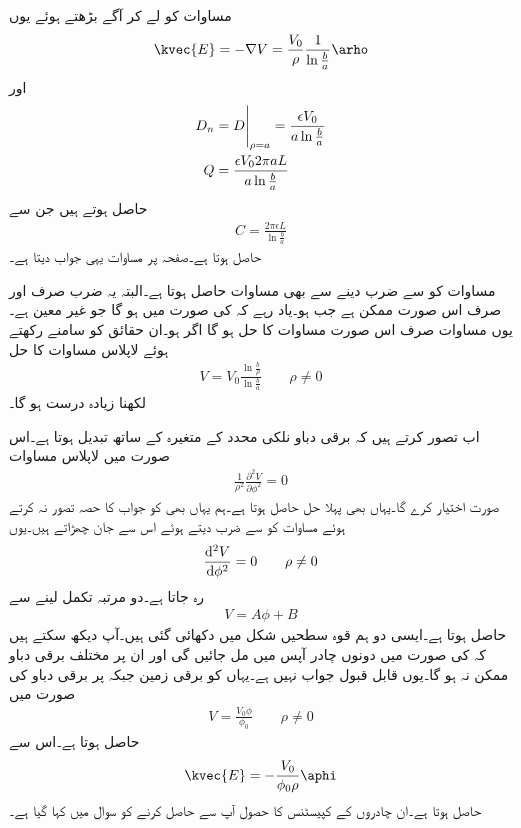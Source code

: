 مساوات  کو لے کر آگے بڑھتے ہوئے یوں
\begin{align*}
\kvec{E}=-\nabla V=\frac{V_0}{\rho} \frac{1}{\ln \frac{b}{a}} \arho
\end{align*}
اور
\begin{align*}
D_n&=\eval{D}_{\rho=a}=\frac{\epsilon V_0}{a\ln \frac{b}{a}}\\
Q&=\frac{\epsilon V_0 2 \pi a L}{a \ln \frac{b}{a}}
\end{align*}
حاصل ہوتے ہیں جن سے
\begin{align}
C=\frac{2\pi \epsilon L}{\ln \frac{b}{a}}
\end{align}
حاصل ہوتا ہے۔صفحہ  پر مساوات  یہی جواب دیتا ہے۔

مساوات  کو  سے ضرب دینے سے بھی مساوات  حاصل ہوتا ہے۔البتہ یہ ضرب صرف اور صرف اس صورت ممکن ہے جب  ہو۔یاد رہے کہ  کی صورت میں  ہو گا جو غیر معین ہے۔یوں  مساوات  صرف اس صورت مساوات  کا حل ہو گا اگر  ہو۔ان حقائق کو سامنے رکھتے ہوئے لاپلاس مساوات کا حل
\begin{align}
V=V_0 \frac{\ln \frac{b}{\rho} }{\ln \frac{b}{a} } \quad \quad \rho \ne 0
\end{align}
لکھنا زیادہ درست ہو گا۔

اب تصور کرتے ہیں کہ برقی دباو نلکی محدد کے متغیرہ  کے ساتھ تبدیل ہوتا ہے۔اس صورت میں لاپلاس مساوات
\begin{align*}
\frac{1}{\rho^2}\frac{\partial^2 V}{\partial \phi^2}=0
\end{align*}
صورت اختیار کرے گا۔یہاں بھی پہلا حل  حاصل ہوتا ہے۔ہم یہاں بھی  کو جواب کا حصہ تصور نہ کرتے ہوئے مساوات کو  سے ضرب دیتے ہوئے اس سے جان چھڑاتے ہیں۔یوں
\begin{align*}
\frac{\dif{^2} V}{\dif \phi^2}=0   \quad \quad \rho \ne 0
\end{align*}
رہ جاتا ہے۔دو مرتبہ تکمل لینے سے
\begin{align*}
V=A \phi+B
\end{align*}
حاصل ہوتا ہے۔ایسی دو ہم قوہ سطحیں شکل میں دکھائی گئی ہیں۔آپ دیکھ سکتے ہیں کہ  کی صورت میں دونوں چادر آپس میں مل جائیں گی اور ان پر مختلف برقی دباو ممکن نہ ہو گا۔یوں  قابل قبول جواب نہیں ہے۔یہاں  کو برقی زمین جبکہ  پر  برقی دباو کی صورت میں
\begin{align}
V=\frac{V_0\phi}{\phi_0}  \quad \quad \rho \ne 0
\end{align}
حاصل ہوتا ہے۔اس سے
\begin{align*}
\kvec{E}=-\frac{V_0}{\phi_0 \rho}\aphi
\end{align*}
حاصل ہوتا ہے۔ان چادروں کے کپیسٹنس کا حصول آپ سے حاصل کرنے کو سوال میں کہا گیا ہے۔

